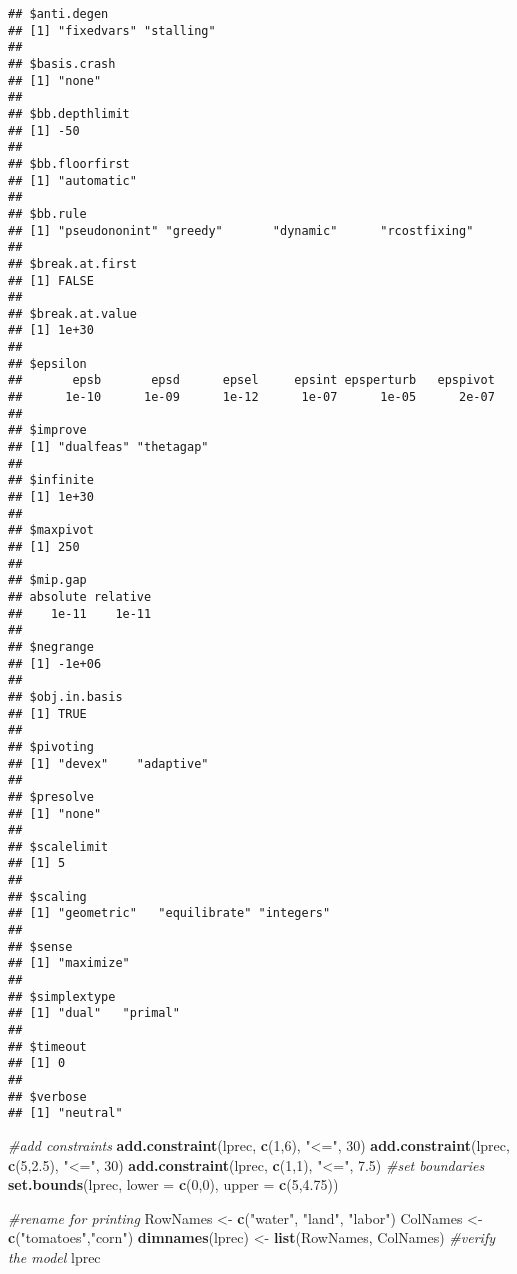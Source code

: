\documentclass[]{article}
\newenvironment{Shaded}{\begin{snugshade}}{\end{snugshade}}
\newcommand{\KeywordTok}[1]{\textcolor[rgb]{0.13,0.29,0.53}{\textbf{#1}}}
\newcommand{\DataTypeTok}[1]{\textcolor[rgb]{0.13,0.29,0.53}{#1}}
\newcommand{\DecValTok}[1]{\textcolor[rgb]{0.00,0.00,0.81}{#1}}
\newcommand{\FloatTok}[1]{\textcolor[rgb]{0.00,0.00,0.81}{#1}}
\newcommand{\StringTok}[1]{\textcolor[rgb]{0.31,0.60,0.02}{#1}}
\newcommand{\CommentTok}[1]{\textcolor[rgb]{0.56,0.35,0.01}{\textit{#1}}}
\newcommand{\NormalTok}[1]{#1}
\begin{document}
\begin{verbatim}
## $anti.degen
## [1] "fixedvars" "stalling" 
## 
## $basis.crash
## [1] "none"
## 
## $bb.depthlimit
## [1] -50
## 
## $bb.floorfirst
## [1] "automatic"
## 
## $bb.rule
## [1] "pseudononint" "greedy"       "dynamic"      "rcostfixing" 
## 
## $break.at.first
## [1] FALSE
## 
## $break.at.value
## [1] 1e+30
## 
## $epsilon
##       epsb       epsd      epsel     epsint epsperturb   epspivot 
##      1e-10      1e-09      1e-12      1e-07      1e-05      2e-07 
## 
## $improve
## [1] "dualfeas" "thetagap"
## 
## $infinite
## [1] 1e+30
## 
## $maxpivot
## [1] 250
## 
## $mip.gap
## absolute relative 
##    1e-11    1e-11 
## 
## $negrange
## [1] -1e+06
## 
## $obj.in.basis
## [1] TRUE
## 
## $pivoting
## [1] "devex"    "adaptive"
## 
## $presolve
## [1] "none"
## 
## $scalelimit
## [1] 5
## 
## $scaling
## [1] "geometric"   "equilibrate" "integers"   
## 
## $sense
## [1] "maximize"
## 
## $simplextype
## [1] "dual"   "primal"
## 
## $timeout
## [1] 0
## 
## $verbose
## [1] "neutral"
\end{verbatim}

\begin{Shaded}
\begin{Highlighting}[]
\CommentTok{#add constraints}
\KeywordTok{add.constraint}\NormalTok{(lprec, }\KeywordTok{c}\NormalTok{(}\DecValTok{1}\NormalTok{,}\DecValTok{6}\NormalTok{), }\StringTok{"<="}\NormalTok{, }\DecValTok{30}\NormalTok{)}
\KeywordTok{add.constraint}\NormalTok{(lprec, }\KeywordTok{c}\NormalTok{(}\DecValTok{5}\NormalTok{,}\FloatTok{2.5}\NormalTok{), }\StringTok{"<="}\NormalTok{, }\DecValTok{30}\NormalTok{)}
\KeywordTok{add.constraint}\NormalTok{(lprec, }\KeywordTok{c}\NormalTok{(}\DecValTok{1}\NormalTok{,}\DecValTok{1}\NormalTok{), }\StringTok{"<="}\NormalTok{, }\FloatTok{7.5}\NormalTok{)}
\CommentTok{#set boundaries}
\KeywordTok{set.bounds}\NormalTok{(lprec, }\DataTypeTok{lower =} \KeywordTok{c}\NormalTok{(}\DecValTok{0}\NormalTok{,}\DecValTok{0}\NormalTok{), }\DataTypeTok{upper =} \KeywordTok{c}\NormalTok{(}\DecValTok{5}\NormalTok{,}\FloatTok{4.75}\NormalTok{))}

\CommentTok{#rename for printing}
\NormalTok{RowNames <-}\StringTok{ }\KeywordTok{c}\NormalTok{(}\StringTok{"water"}\NormalTok{, }\StringTok{"land"}\NormalTok{, }\StringTok{"labor"}\NormalTok{)}
\NormalTok{ColNames <-}\StringTok{ }\KeywordTok{c}\NormalTok{(}\StringTok{"tomatoes"}\NormalTok{,}\StringTok{"corn"}\NormalTok{)}
\KeywordTok{dimnames}\NormalTok{(lprec) <-}\StringTok{ }\KeywordTok{list}\NormalTok{(RowNames, ColNames)}
\CommentTok{#verify the model}
\NormalTok{lprec}
\end{Highlighting}
\end{Shaded}
\end{document}
